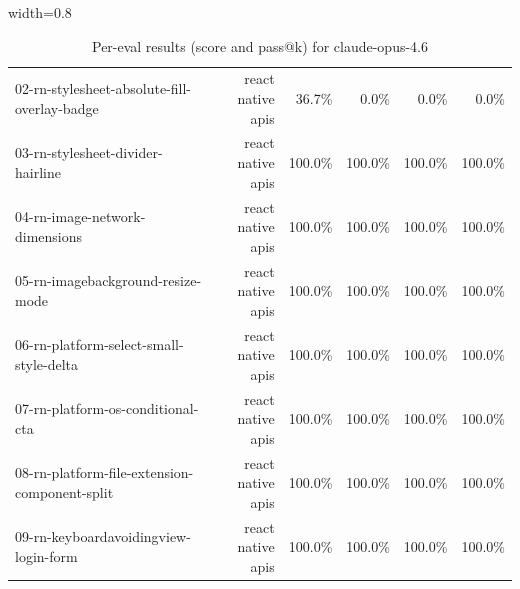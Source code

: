 \begin{table}[htbp]
\begin{adjustbox}{width=0.8\textwidth}
\begin{tabular}{lrrrrr}
02-rn-stylesheet-absolute-fill-overlay-badge & react native apis & 36.7\% & 0.0\% & 0.0\% & 0.0\% \\
03-rn-stylesheet-divider-hairline & react native apis & 100.0\% & 100.0\% & 100.0\% & 100.0\% \\
04-rn-image-network-dimensions & react native apis & 100.0\% & 100.0\% & 100.0\% & 100.0\% \\
05-rn-imagebackground-resize-mode & react native apis & 100.0\% & 100.0\% & 100.0\% & 100.0\% \\
06-rn-platform-select-small-style-delta & react native apis & 100.0\% & 100.0\% & 100.0\% & 100.0\% \\
07-rn-platform-os-conditional-cta & react native apis & 100.0\% & 100.0\% & 100.0\% & 100.0\% \\
08-rn-platform-file-extension-component-split & react native apis & 100.0\% & 100.0\% & 100.0\% & 100.0\% \\
09-rn-keyboardavoidingview-login-form & react native apis & 100.0\% & 100.0\% & 100.0\% & 100.0\% \\
\bottomrule
\end{tabular}
\end{adjustbox}
\caption{Per-eval results (score and pass@k) for claude-opus-4.6}
\end{table}
